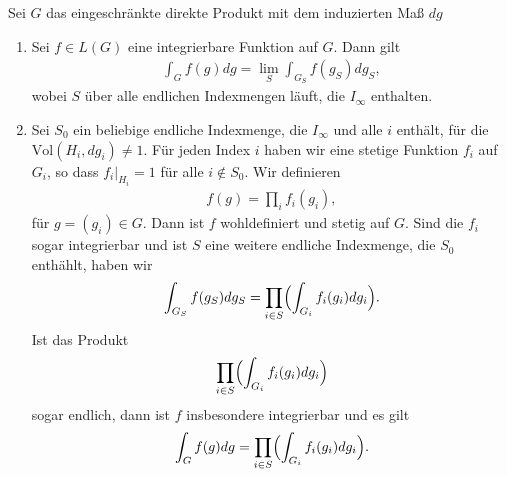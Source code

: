 		\begin{proposition}\label{prop:integrieren}
			Sei $G$ das eingeschränkte direkte Produkt mit dem induzierten Maß $dg$
			\begin{enumerate}[label=(\roman*)]
				\item Sei $f \in L(G)$ eine integrierbare Funktion auf $G$. Dann gilt
					\begin{align*}
						\int_G f(g)dg = \lim_S \int_{G_S} f(g_S) dg_S,
					\end{align*}
					wobei $S$ über alle endlichen Indexmengen läuft, die $I_\infty$ enthalten.
				\item Sei $S_0$ ein beliebige endliche Indexmenge, die $I_\infty$ und alle $i$ enthält, für die $\text{Vol}(H_i, dg_i) \not= 1$. 
					Für jeden Index $i$ haben wir eine stetige Funktion $f_i$ auf $G_i$, so dass $f_i |_{H_i} = 1$ für alle $i \notin S_0$. 
					Wir definieren
					\begin{align*}
						f(g) = \prod_{i}f_{i}(g_i),
					\end{align*}
					für $g=(g_i) \in G$. 
					Dann ist $f$ wohldefiniert und stetig auf $G$. 
					Sind die $f_i$ sogar integrierbar und ist $S$ eine weitere endliche Indexmenge, die $S_0$ enthählt, haben wir
					\begin{align}\label{eq:satz:integration}
						\int_{G_S} f(g_S) dg_S = \prod_{i \in S}\Bigl(\int_{G_i} f_i (g_i)dg_i\Bigr).
					\end{align}
					Ist das Produkt
					\begin{align*}
						\prod_{i \in S}\Bigl(\int_{G_i} f_i (g_i)dg_i\Bigr)
					\end{align*}
					sogar endlich, dann ist $f$ insbesondere integrierbar und es gilt
					\begin{align*}
						\int_{G} f(g) dg = \prod_{i \in S}\Bigl(\int_{G_i} f_i (g_i)dg_i\Bigr).
					\end{align*}	
			\end{enumerate}
		\end{proposition}
